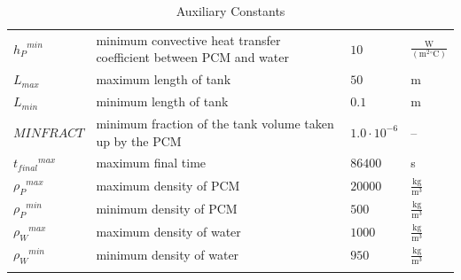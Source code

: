 \documentclass[12pt]{article}
\begin{document}
\begin{longtabu}{l X[l] l l}
\\
${{h_{P}}^{min}}$ & minimum convective heat transfer coefficient between PCM and water & $10$ & $\frac{\text{W}}{(\text{m}^{2}{}^{\circ}\text{C})}$
\\
${L_{max}}$ & maximum length of tank & $50$ & m
\\
${L_{min}}$ & minimum length of tank & $0.1$ & m
\\
$MINFRACT$ & minimum fraction of the tank volume taken up by the PCM & $1.0\cdot{}10^{-6}$ & --
\\
${{t_{final}}^{max}}$ & maximum final time & $86400$ & s
\\
${{ρ_{P}}^{max}}$ & maximum density of PCM & $20000$ & $\frac{\text{kg}}{\text{m}^{3}}$
\\
${{ρ_{P}}^{min}}$ & minimum density of PCM & $500$ & $\frac{\text{kg}}{\text{m}^{3}}$
\\
${{ρ_{W}}^{max}}$ & maximum density of water & $1000$ & $\frac{\text{kg}}{\text{m}^{3}}$
\\
${{ρ_{W}}^{min}}$ & minimum density of water & $950$ & $\frac{\text{kg}}{\text{m}^{3}}$
\\
\bottomrule
\caption{Auxiliary Constants}
\label{Table:TAuxConsts}
\end{longtabu}
\end{document}
